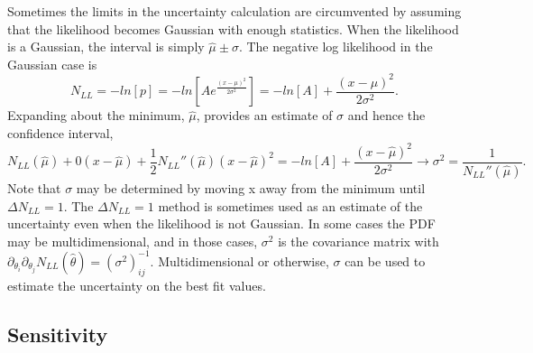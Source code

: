 \documentclass[12pt]{article}
\begin{document}
Sometimes the limits in the uncertainty calculation are circumvented by assuming that the likelihood becomes Gaussian with enough statistics. When the likelihood is a Gaussian, the interval is simply $\hat{\mu} \pm \sigma$. The negative log likelihood in the Gaussian case is
\begin{equation}
N_{LL} = -ln[p] = -ln\left[Ae^{\frac{(x-\mu)^2}{2\sigma^2}}\right]= -ln[A] + \frac{(x-\mu)^2}{2\sigma^2}.
\end{equation}
Expanding about the minimum, $\hat{\mu}$, provides an estimate of $\sigma$ and hence the confidence interval, 
\begin{equation}
N_{LL}(\hat{\mu}) + 0(x-\hat{\mu}) + \frac{1}{2}N_{LL}''(\hat{\mu})(x-\hat{\mu})^2 = -ln[A] + \frac{(x-\hat{\mu})^2}{2\sigma^2} \rightarrow \sigma^2 = \frac{1}{N_{LL}''(\hat{\mu})}.
\end{equation}
Note that $\sigma$ may be determined by moving x away from the minimum until $\Delta N_{LL} = 1$. The $\Delta N_{LL} = 1$ method is sometimes used as an estimate of the uncertainty even when the likelihood is not Gaussian. In some cases the PDF may be multidimensional, and in those cases, $\sigma^2$ is the covariance matrix with $\partial_{\theta_i}\partial_{\theta_j}N_{LL}(\hat{\theta}) = (\sigma^2)^{-1}_{ij}$. Multidimensional or otherwise, $\sigma$ can be used to estimate the uncertainty on the best fit values. 

\subsection{Sensitivity}
\end{document}
